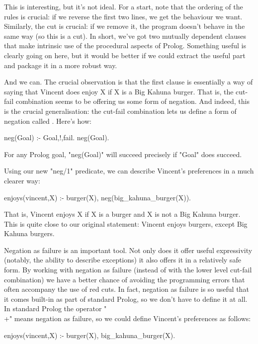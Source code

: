 This is interesting, but it's not ideal.  For a start, note that the
ordering of the rules is crucial: if we reverse the first two lines,
we  get the behaviour we want.  Similarly, the cut is
crucial: if we remove it, the program doesn't behave in the same way
(so this is a  cut).  In short, we've got two mutually
dependent clauses that make intrinsic use of the procedural aspects of
Prolog.  Something useful is clearly going on here, but it would be
better if we could extract the useful part and package it in a more
robust way.

And we can.  The crucial observation is that the first clause is
essentially a way of saying that Vincent does  enjoy X if X
is a Big Kahuna burger.  That is, the cut-fail combination seems to be
offering us some form of negation.  And indeed, this is the crucial
generalisation: the cut-fail combination lets us define a form of
negation called .  Here's how:
\begin{LPNcodedisplay}
neg(Goal) :- Goal,!,fail.
neg(Goal).
\end{LPNcodedisplay}
For any Prolog goal, "neg(Goal)" will succeed precisely if
"Goal" does  succeed.

Using our new "neg/1" predicate, we can describe Vincent's
preferences in a much clearer way:
\begin{LPNcodedisplay}
enjoys(vincent,X) :- burger(X),
                      neg(big_kahuna_burger(X)).
\end{LPNcodedisplay}
That is, Vincent enjoys X if X is a burger and X is not a Big Kahuna
burger.  This is quite close to our original statement: Vincent enjoys
burgers, except Big Kahuna burgers.

Negation as failure is an important tool.  Not only does it offer
useful expressivity (notably, the ability to describe exceptions) it
also offers it in a relatively safe form.  By working with negation as
failure (instead of with the lower level cut-fail combination) we have
a better chance of avoiding the programming errors that often
accompany the use of red cuts.  In fact, negation as failure is so
useful that it comes built-in as part of standard Prolog, so we don't
have to define it at all.  In standard Prolog the operator "\\+" means
negation as failure, so we could define Vincent's preferences as
follows:
\begin{LPNcodedisplay}
enjoys(vincent,X) :- burger(X),
                      \+ big_kahuna_burger(X).
\end{LPNcodedisplay}



